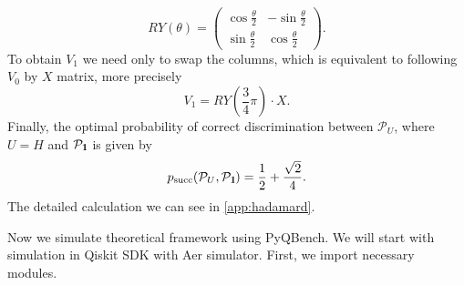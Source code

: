 \documentclass[preprint,12pt, a4paper, dvipsnames]{elsarticle}
\newcommand{\1}{{\rm 1\hspace{-0.9mm}l}}
\newcommand{\Id}{{\rm 1\hspace{-0.9mm}l}}
\newcommand{\PP}{\mathcal{P}}
\begin{document}
\begin{equation}
RY(\theta) =
\left(\begin{array}{cc} \cos\frac{\theta}{2} & -\sin\frac{\theta}{2} \\ \sin\frac{\theta}{2} & \cos\frac{\theta}{2} \end{array}\right).
\end{equation}
To obtain $V_1$  we need only to swap the columns, which is equivalent to following $V_0$ by $X$ matrix, more precisely
\begin{equation}
V_1 =  RY\left(\frac{3}{4} \pi \right) \cdot X.
\end{equation}
Finally, the optimal probability of correct discrimination between $\PP_{U}$, where $U=H$ and $\PP_{\Id}$ is given by 
\begin{equation}
p_{\text{succ}}(\PP_{U}, \PP_{\Id}) = \frac{1}{2} + \frac{\sqrt{2}}{4}. 
\end{equation}
The detailed calculation we can see in \ref{app:hadamard}. 

Now we simulate  theoretical framework using PyQBench. We will start with simulation in Qiskit SDK with Aer simulator. First, we import necessary modules.  
\end{document}
